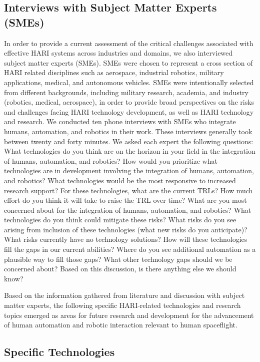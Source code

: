 \subsection{Interviews with Subject Matter Experts (SMEs)}
In order to provide a current assessment of the critical challenges associated with effective HARI systems across industries and domains, we also interviewed subject matter experts (SMEs). SMEs were chosen to represent a cross section of HARI related disciplines such as aerospace, industrial robotics, military applications, medical, and autonomous vehicles. SMEs were intentionally selected from different backgrounds, including military research, academia, and industry (robotics, medical, aerospace), in order to provide broad perspectives on the risks and challenges facing HARI technology development, as well as HARI technology and research. We conducted ten phone interviews with SMEs who integrate humans, automation, and robotics in their work. These interviews generally took between twenty and forty minutes. We asked each expert the following questions:
	What technologies do you think are on the horizon in your field in the integration of humans, automation, and robotics?
	How would you prioritize what technologies are in development involving the integration of humans, automation, and robotics?
	What technologies would be the most responsive to increased research support?
	For these technologies, what are the current TRLs? How much effort do you think it will take to raise the TRL over time?
	What are you most concerned about for the integration of humans, automation, and robotics? What technologies do you think could mitigate these risks?
	What risks do you see arising from inclusion of these technologies (what new risks do you anticipate)?
	What risks currently have no technology solutions?
	How will these technologies fill the gaps in our current abilities?
	Where do you see additional automation as a plausible way to fill those gaps?
	What other technology gaps should we be concerned about?
	Based on this discussion, is there anything else we should know?

Based on the information gathered from literature and discussion with subject matter experts, the following specific HARI-related technologies and research topics emerged as areas for future research and development for the advancement of human automation and robotic interaction relevant to human spaceflight.

\subsection{Specific Technologies}

